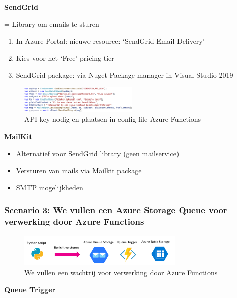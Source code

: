 \documentclass{article}
\newcommand{\bold}[1]{\textbf{#1}}
\begin{document}
\bold{SendGrid}

= Library om emails te sturen

\begin{enumerate}
    \item In Azure Portal: nieuwe resource: `SendGrid Email Delivery'
    \item Kies voor het `Free' pricing tier
    \item SendGrid package: via Nuget Package manager in Visual Studio 2019
\end{enumerate}

\begin{figure}[H]
    \centering
    \includegraphics[width=0.5\textwidth]{scenario-2-3.png}
    \caption{API key nodig en plaatsen in config file Azure Functions}
\end{figure}


\bold{MailKit}

\begin{itemize}
    \item Alternatief voor SendGrid library (geen mailservice)
    \item Versturen van mails via Mailkit package
    \item SMTP mogelijkheden
\end{itemize}

\subsubsection{Scenario 3: We vullen een Azure Storage Queue voor verwerking door Azure Functions}

\begin{figure}[H]
    \centering
    \includegraphics[width=0.7\textwidth]{azure-storage-scenario-3.png}
    \caption{We vullen een wachtrij voor verwerking door Azure Functions}
\end{figure}

\bold{Queue Trigger}
\end{document}

